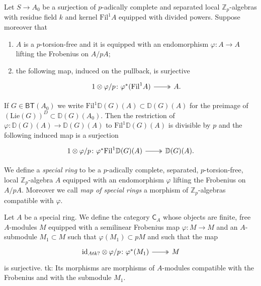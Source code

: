 \documentclass[../Main]{subfiles}
\begin{document}
\begin{lem}
	Let $S \to A_0$ be a surjection of $p$-adically complete
	and separated local $\mathbb{Z}_{p}$-algebras with residue field
	$k$ and kernel $\mathrm{Fil}^1 A$ equipped with divided powers.
	Suppose moreover that
\begin{enumerate}
	\item $A$ is a $p$-torsion-free and it is equipped with an endomorphism
		$\varphi\colon A \to A$ lifting the Frobenius on $A/pA$;
		
	\item the following map, induced on the pullback, is surjective
		\begin{equation*}
		\begin{tikzcd}
			1 \otimes \varphi/p \colon
			\varphi^*(\mathrm{Fil}^1 A)
			\arrow[r, "", twoheadrightarrow] &
			A
		.\end{tikzcd}
		\end{equation*}
\end{enumerate}
	If $G \in \mathsf{BT}(A_0)$ we write $\mathrm{Fil}^1 \mathbb{D}(G)(A) \subset \mathbb{D}(G)(A)$
	for the preimage of $\left( \mathrm{Lie}(G) \right)^D \subset \mathbb{D}(G)(A_0)$.
	Then the restriction of $\varphi\colon \mathbb{D}(G)(A) \to \mathbb{D}(G)(A)$
	to $\mathrm{Fil}^1 \mathbb{D}(G)(A)$ is divisible by $p$ and the following induced map
	is a surjection
	\begin{equation*}
	\begin{tikzcd}
		1 \otimes \varphi/p \colon
		\varphi^*\mathrm{Fil}^1 \mathbb{D}(G)(A)
		\arrow[r, "", twoheadrightarrow] &
		\mathbb{D}(G)(A)
	.\end{tikzcd}
	\end{equation*}
\end{lem} 


\begin{defn}
	We define a {\em special ring} to be a $p$-adically complete, separated, $p$-torsion-free,
	local $\mathbb{Z}_{p}$-algebra $A$ equipped with an endomorphism $\varphi$
	lifting the Frobenius on $A/pA$.
	Moreover we call {\em map of special rings} a morphism
	of $\mathbb{Z}_{p}$-algebras compatible with $\varphi$.
\end{defn}


\begin{defn}[]
	Let $A$ be a special ring. We define the category
	$\mathsf{C}_A$ whose objects are finite, free $A$-modules
	$M$ equipped with a semilinear Frobenius map $\varphi\colon M \to M$
	and an $A$-submodule $M_1 \subset M$ such that $\varphi(M_1) \subset pM$
	and such that the map
	\begin{equation*}
	\begin{tikzcd}[row sep = 0ex
		,/tikz/column 1/.append style={anchor=base east}
		,/tikz/column 2/.append style={anchor=base west}]
		\mathrm{id}_{ Atk? }\otimes\varphi/p\colon 
		\varphi^*(M_1) \arrow[r, "", twoheadrightarrow] &
		M
	\end{tikzcd}
	\end{equation*} 
	is surjective.
	tk: Its morphisms are morphisms of $A$-modules compatible with
	the Frobenius and with the submodule $M_1$.
\end{defn}
\end{document}
